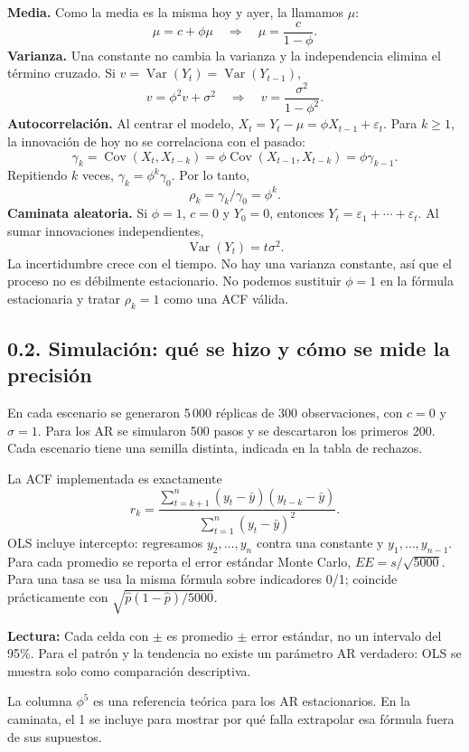 \documentclass[11pt,letterpaper]{article}
\newcommand{\tabla}[2]{\begin{center}\small\textbf{Lectura:} #2\end{center}}
\begin{document}
\textbf{Media.} Como la media es la misma hoy y ayer, la llamamos $\mu$:
\[
\mu=c+\phi\mu\quad\Longrightarrow\quad \boxed{\mu=\frac{c}{1-\phi}}.
\]
\textbf{Varianza.} Una constante no cambia la varianza y la independencia elimina el término cruzado. Si $v=\operatorname{Var}(Y_t)=\operatorname{Var}(Y_{t-1})$,
\[
v=\phi^2v+\sigma^2\quad\Longrightarrow\quad
\boxed{v=\frac{\sigma^2}{1-\phi^2}}.
\]
\textbf{Autocorrelación.} Al centrar el modelo, $X_t=Y_t-\mu=\phi X_{t-1}+\varepsilon_t$. Para $k\geq1$, la innovación de hoy no se correlaciona con el pasado:
\[
\gamma_k=\operatorname{Cov}(X_t,X_{t-k})
=\phi\operatorname{Cov}(X_{t-1},X_{t-k})=\phi\gamma_{k-1}.
\]
Repitiendo $k$ veces, $\gamma_k=\phi^k\gamma_0$. Por lo tanto,
\[\boxed{\rho_k=\gamma_k/\gamma_0=\phi^k}.\]
\textbf{Caminata aleatoria.} Si $\phi=1$, $c=0$ y $Y_0=0$, entonces $Y_t=\varepsilon_1+\cdots+\varepsilon_t$. Al sumar innovaciones independientes,
\[\boxed{\operatorname{Var}(Y_t)=t\sigma^2}.\]
La incertidumbre crece con el tiempo. No hay una varianza constante, así que el proceso no es débilmente estacionario. No podemos sustituir $\phi=1$ en la fórmula estacionaria y tratar $\rho_k=1$ como una ACF válida.

\subsection{0.2. Simulación: qué se hizo y cómo se mide la precisión}
En cada escenario se generaron 5\,000 réplicas de 300 observaciones, con $c=0$ y $\sigma=1$. Para los AR se simularon 500 pasos y se descartaron los primeros 200. Cada escenario tiene una semilla distinta, indicada en la tabla de rechazos.

La ACF implementada es exactamente
\[
r_k=\frac{\sum_{t=k+1}^n(y_t-\bar y)(y_{t-k}-\bar y)}
{\sum_{t=1}^n(y_t-\bar y)^2}.
\]
OLS incluye intercepto: regresamos $y_2,\ldots,y_n$ contra una constante y $y_1,\ldots,y_{n-1}$. Para cada promedio se reporta el error estándar Monte Carlo, $EE=s/\sqrt{5000}$. Para una tasa se usa la misma fórmula sobre indicadores 0/1; coincide prácticamente con $\sqrt{\hat p(1-\hat p)/5000}$.

\tabla{simulacion}{Cada celda con $\pm$ es promedio $\pm$ error estándar, no un intervalo del 95\%. Para el patrón y la tendencia no existe un parámetro AR verdadero: OLS se muestra solo como comparación descriptiva.}
La columna $\phi^5$ es una referencia teórica para los AR estacionarios. En la caminata, el 1 se incluye para mostrar por qué falla extrapolar esa fórmula fuera de sus supuestos.
\end{document}
